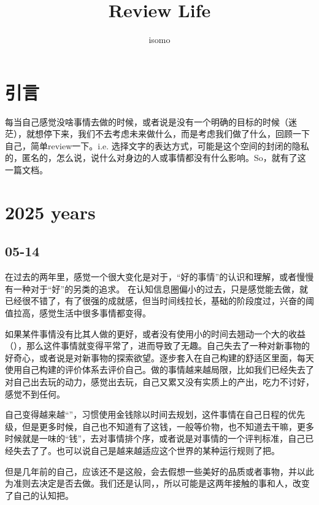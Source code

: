\documentclass{article}
\title{Review Life}
\author{isomo}
\begin{document}
\maketitle

\section{引言}

每当自己感觉没啥事情去做的时候，或者说是没有一个明确的目标的时候（迷茫），就想停下来，我们不去考虑未来做什么，而是考虑我们做了什么，回顾一下自己，简单review一下。i.e. 选择文字的表达方式，可能是这个空间的封闭的隐私的，匿名的，怎么说，说什么对身边的人或事情都没有什么影响。So，就有了这一篇文档。

\section{2025 years}

\subsection{05-14}

在过去的两年里，感觉一个很大变化是对于，“好的事情”的认识和理解，或者慢慢有一种对于“好”的另类的追求。
在认知信息圈偏小的过去，只是感觉能去做，就已经很不错了，有了很强的成就感，但当时间线拉长，基础的阶段度过，兴奋的阈值拉高，感觉生活中很多事情都变得。

如果某件事情没有比其人做的更好，或者没有使用小的时间去翘动一个大的收益（），那么这件事情就变得平常了，进而导致了无趣。自己失去了一种对新事物的好奇心，或者说是对新事物的探索欲望。逐步套入在自己构建的舒适区里面，每天使用自己构建的评价体系去评价自己。做的事情越来越局限，比如我们已经失去了对自己出去玩的动力，感觉出去玩，自己又累又没有实质上的产出，吃力不讨好，感觉不到任何。

自己变得越来越“”，习惯使用金钱除以时间去规划，这件事情在自己日程的优先级，但是更多时候，自己也不知道有了这钱，一般等价物，也不知道去干嘛，更多时候就是一味的“钱”，去对事情排个序，或者说是对事情的一个评判标准，自己已经失去了了。也可以说自己是越来越适应这个世界的某种运行规则了把。

但是几年前的自己，应该还不是这般，会去假想一些美好的品质或者事物，并以此为准则去决定是否去做。我们还是认同，，所以可能是这两年接触的事和人，改变了自己的认知把。


% 
% 
\end{document}
